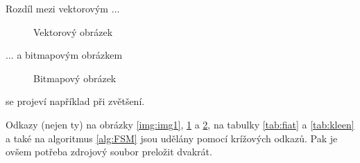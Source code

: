 \documentclass[11pt]{article}
\begin{document}
\begin{figure}[H]
\begin{center}

    \end{center}
\end{figure}
\newpage
\noindent Rozdíl mezi vektorovým $\dots$

\begin{figure}[ht]
    \centering
    \caption{Vektorový obrázek}
    \label{fig:img2}
\end{figure}

\noindent $\dots$ a bitmapovým obrázkem
\begin{figure}[ht]
    \centering
    \caption{Bitmapový obrázek}
    \label{fig:img3}
\end{figure}

\noindent se projeví například při zvětšení.

Odkazy (nejen ty) na obrázky \ref{img:img1}, \ref{fig:img2} a \ref{fig:img3}, na tabulky \ref{tab:fiat} a \ref{tab:kleen} a také na algoritmus \ref{alg:FSM} jsou udělány pomocí krížových odkazů. Pak je ovšem potřeba zdrojový soubor preložit dvakrát.
\end{document}
